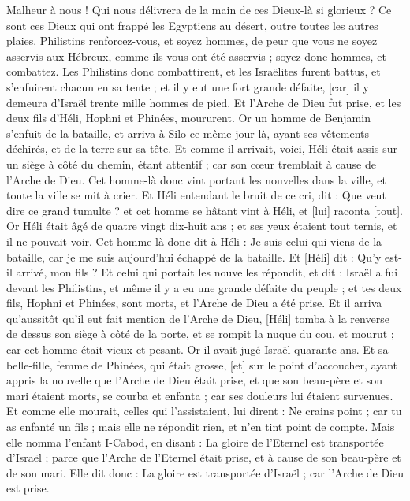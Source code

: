 \begin{multicols}{2}
Malheur à nous ! Qui nous délivrera de la main de ces Dieux-là si glorieux ? Ce sont ces Dieux qui ont frappé les Egyptiens au désert, outre toutes les autres plaies.
Philistins renforcez-vous, et soyez hommes, de peur que vous ne soyez asservis aux Hébreux, comme ils vous ont été asservis ; soyez donc hommes, et combattez.
Les Philistins donc combattirent, et les Israëlites furent battus, et s'enfuirent chacun en sa tente ; et il y eut une fort grande défaite, [car] il y demeura d'Israël trente mille hommes de pied.
Et l'Arche de Dieu fut prise, et les deux fils d'Héli, Hophni et Phinées, moururent.
Or un homme de Benjamin s'enfuit de la bataille, et arriva à Silo ce même jour-là, ayant ses vêtements déchirés, et de la terre sur sa tête.
Et comme il arrivait, voici, Héli était assis sur un siège à côté du chemin, étant attentif ; car son cœur tremblait à cause de l'Arche de Dieu. Cet homme-là donc vint portant les nouvelles dans la ville, et toute la ville se mit à crier.
Et Héli entendant le bruit de ce cri, dit : Que veut dire ce grand tumulte ? et cet homme se hâtant vint à Héli, et [lui] raconta [tout].
Or Héli était âgé de quatre vingt dix-huit ans ; et ses yeux étaient tout ternis, et il ne pouvait voir.
Cet homme-là donc dit à Héli : Je suis celui qui viens de la bataille, car je me suis aujourd'hui échappé de la bataille. Et [Héli] dit : Qu'y est-il arrivé, mon fils ?
Et celui qui portait les nouvelles répondit, et dit : Israël a fui devant les Philistins, et même il y a eu une grande défaite du peuple ; et tes deux fils, Hophni et Phinées, sont morts, et l'Arche de Dieu a été prise.
Et il arriva qu'aussitôt qu'il eut fait mention de l'Arche de Dieu, [Héli] tomba à la renverse de dessus son siège à côté de la porte, et se rompit la nuque du cou, et mourut ; car cet homme était vieux et pesant. Or il avait jugé Israël quarante ans.
Et sa belle-fille, femme de Phinées, qui était grosse, [et] sur le point d'accoucher, ayant appris la nouvelle que l'Arche de Dieu était prise, et que son beau-père et son mari étaient morts, se courba et enfanta ; car ses douleurs lui étaient survenues.
Et comme elle mourait, celles qui l'assistaient, lui dirent : Ne crains point ; car tu as enfanté un fils ; mais elle ne répondit rien, et n'en tint point de compte.
Mais elle nomma l'enfant I-Cabod, en disant : La gloire de l'Eternel est transportée d'Israël ; parce que l'Arche de l'Eternel était prise, et à cause de son beau-père et de son mari.
Elle dit donc : La gloire est transportée d'Israël ; car l'Arche de Dieu est prise.

\end{multicols}
